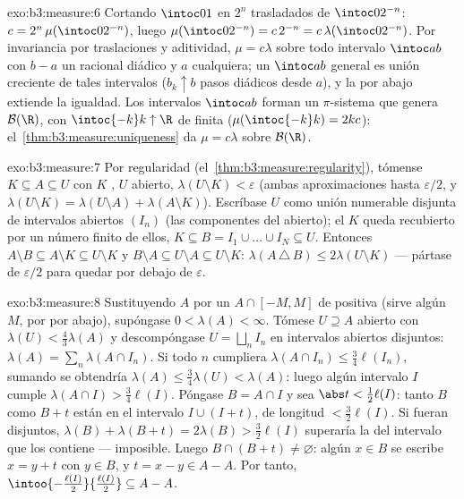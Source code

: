\begin{solution}{exo:b3:measure:6}
Cortando $\intoc01$ en $2^n$ trasladados de $\intoc0{2^{-n}}$:
$c = 2^n\,\mu(\intoc0{2^{-n}})$, luego $\mu(\intoc0{2^{-n}}) =
c\,2^{-n} = c\,\lambda(\intoc0{2^{-n}})$. Por invariancia por
traslaciones y aditividad, $\mu = c\lambda$ sobre todo intervalo
$\intoc ab$ con $b - a$ un racional diádico y $a$ cualquiera; un
$\intoc ab$ general es unión creciente de tales intervalos
($b_k \uparrow b$ pasos diádicos desde $a$), y la
 por abajo extiende la
igualdad. Los intervalos $\intoc ab$ forman un $\pi$-sistema que genera
$\mathcal B(\R)$, con $\intoc{-k}k
\uparrow \R$ de  finita
($\mu(\intoc{-k}k) = 2kc$): el~\cref{thm:b3:measure:uniqueness} da
$\mu = c\lambda$ sobre
$\mathcal B(\R)$.
\end{solution}

\begin{solution}{exo:b3:measure:7}
Por regularidad (el~\cref{thm:b3:measure:regularity}), tómense $K
\subseteq A \subseteq U$ con $K$
, $U$ abierto,
$\lambda(U\setminus K) < \varepsilon$ (ambas aproximaciones hasta
$\varepsilon/2$, y $\lambda(U \setminus K) =
\lambda(U\setminus A) + \lambda(A \setminus K)$). Escríbase $U$ como
unión numerable disjunta de intervalos abiertos $(I_n)$ (las componentes
del abierto); el
 $K$ queda recubierto por un
número finito de ellos, $K \subseteq B = I_1\cup\dots\cup I_N \subseteq
U$. Entonces $A \setminus B \subseteq A\setminus K \subseteq
U\setminus K$ y $B \setminus A \subseteq U \setminus A
\subseteq U\setminus K$:
$\lambda(A\,\triangle\,B) \leq 2\lambda(U\setminus K)$ ---
pártase de $\varepsilon/2$ para quedar por debajo de $\varepsilon$.
\end{solution}

\begin{solution}{exo:b3:measure:8}
Sustituyendo $A$ por un $A \cap [-M, M]$ de
 positiva (sirve algún $M$, por
 por abajo), supóngase
$0 < \lambda(A) <
\infty$. Tómese $U \supseteq A$ abierto con $\lambda(U) <
\frac43\lambda(A)$ y descompóngase $U = \bigsqcup_nI_n$ en intervalos
abiertos disjuntos: $\lambda(A) = \sum_n\lambda(A\cap
I_n)$. Si todo $n$ cumpliera $\lambda(A\cap I_n) \leq
\frac34\ell(I_n)$, sumando se obtendría $\lambda(A) \leq
\frac34\lambda(U) < \lambda(A)$: luego algún intervalo $I$ cumple
$\lambda(A\cap I) > \frac34\ell(I)$. Póngase $B = A \cap I$ y sea
$\abs t < \frac12\ell(I)$: tanto $B$ como $B + t$ están en el intervalo
$I \cup (I + t)$, de longitud $< \frac32\ell(I)$. Si fueran disjuntos,
$\lambda(B) + \lambda(B + t) = 2\lambda(B)
> \frac32\ell(I)$ superaría la 
del intervalo que los contiene --- imposible. Luego
$B \cap (B + t) \neq \varnothing$: algún $x \in B$ se escribe
$x = y + t$ con $y \in B$, y $t = x -
y \in A - A$. Por tanto,
$\intoo{-\frac{\ell(I)}2}{\frac{\ell(I)}2} \subseteq A -
A$.
\end{solution}

